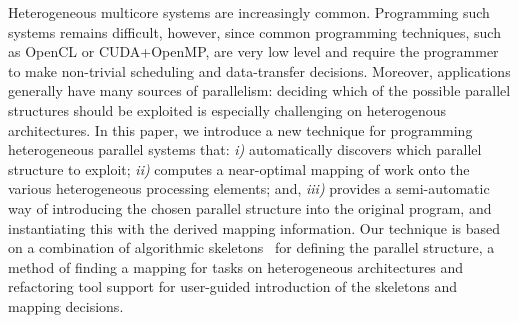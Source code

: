 \documentclass[smallextended]{svjour3}
\begin{document}
\noindent
Heterogeneous multicore systems are increasingly common.
Programming such systems remains difficult, however, since
common programming techniques, such as OpenCL or CUDA+OpenMP,
are very low level and 
require the programmer to make non-trivial scheduling and data-transfer decisions.
Moreover, applications generally have many sources of parallelism: deciding
which of the possible parallel structures should be exploited is especially challenging on heterogenous architectures.
%
In this paper, we introduce a new technique for programming heterogeneous parallel systems
that: \emph{i)} automatically discovers which parallel structure to exploit; \emph{ii)} computes a near-optimal mapping of work onto
the various heterogeneous processing elements; and, \emph{iii)} provides a semi-automatic way of
introducing the chosen parallel structure into the original program, and instantiating this with the derived mapping information.
Our technique is based on a combination of algorithmic skeletons~\cite{cole-th} for defining the parallel structure, %
 a method of finding a mapping for tasks on
 heterogeneous architectures %
 and refactoring tool support for user-guided introduction of the skeletons and mapping decisions. 
\end{document}
